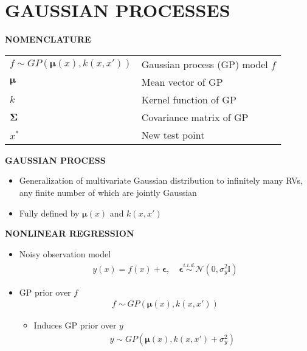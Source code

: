\section{GAUSSIAN PROCESSES}

\begin{yellowbox}{\textbf{NOMENCLATURE}}
    \begin{tabularx}{\columnwidth}{ll}
        $f\sim GP(\bm{\mu}(x),k(x,x'))$ & Gaussian process (GP) model $f$\\
        \addlinespace[2pt]
        $\bm{\mu}$ & Mean vector of GP\\
        \addlinespace[2pt]
        $k$ & Kernel function of GP\\
        \addlinespace[2pt]
        $\bm{\Sigma}$ & Covariance matrix of GP\\
        \addlinespace[2pt]
        $x^*$ & New test point
    \end{tabularx}
\end{yellowbox}

\begin{whitebox}{\textbf{GAUSSIAN PROCESS}}
    \begin{itemize}
        \item Generalization of multivariate Gaussian distribution to infinitely many RVs, any finite number of which are jointly Gaussian
        \item Fully defined by $\bm{\mu}(x)$ and $k(x,x')$
        
    \end{itemize}
\end{whitebox}

\begin{whitebox}{\textbf{NONLINEAR REGRESSION}}
    \begin{itemize}
        \item Noisy observation model
        \begin{align*}
            y(x)=f(x)+\bm{\epsilon},\quad\bm{\epsilon}\overset{i.i.d.}{\sim}\mathcal{N}(0,\sigma_y^2\mathbb{I})
        \end{align*}
        \item GP prior over $f$
        \begin{align*}
            f\sim GP(\bm{\mu}(x), k(x,x'))
        \end{align*}
        \begin{itemize}
            \item Induces GP prior over $y$
            \begin{align*}
                y\sim GP(\bm{\mu}(x), k(x,x')+\sigma_y^2)
            \end{align*}
        \end{itemize}
    \end{itemize}
\end{whitebox}

